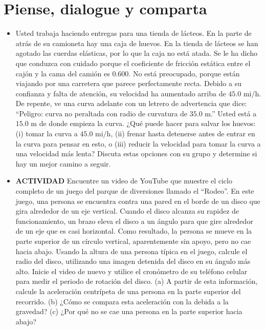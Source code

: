 \documentclass[11pt,a4paper]{article}
\begin{document}
\section*{Piense, dialogue y comparta}

\begin{itemize}
    \item[\textbf{1.}] Usted trabaja haciendo entregas para una tienda de lácteos. En la parte de atrás de su camioneta hay una caja de huevos. En la tienda de lácteos se han agotado las cuerdas elásticas, por lo que la caja no está atada. Se le ha dicho que conduzca con cuidado porque el coeficiente de fricción estática entre el cajón y la cama del camión es $0.600$. No está preocupado, porque están viajando por una carretera que parece perfectamente recta. Debido a su confianza y falta de atención, su velocidad ha aumentado arriba de $45.0 \text{ mi/h}$. De repente, ve una curva adelante con un letrero de advertencia que dice: ``Peligro: curva no peraltada con radio de curvatura de $35.0 \text{ m}$.'' Usted está a $15.0 \text{ m}$ de donde empieza la curva. ¿Qué puede hacer para salvar los huevos: (i) tomar la curva a $45.0 \text{ mi/h}$, (ii) frenar hasta detenerse antes de entrar en la curva para pensar en esto, o (iii) reducir la velocidad para tomar la curva a una velocidad más lenta? Discuta estas opciones con su grupo y determine si hay un mejor camino a seguir.
    \vspace*{9cm}

    \item[\textbf{2.}] \textbf{ACTIVIDAD} Encuentre un video de YouTube que muestre el ciclo completo de un juego del parque de diversiones llamado el ``Rodeo''. En este juego, una persona se encuentra contra una pared en el borde de un disco que gira alrededor de un eje vertical. Cuando el disco alcanza su rapidez de funcionamiento, un brazo eleva el disco a un ángulo para que gire alrededor de un eje que es casi horizontal. Como resultado, la persona se mueve en la parte superior de un círculo vertical, aparentemente sin apoyo, pero no cae hacia abajo. Usando la altura de una persona típica en el juego, calcule el radio del disco, utilizando una imagen detenida del disco en su ángulo más alto. Inicie el video de nuevo y utilice el cronómetro de su teléfono celular para medir el periodo de rotación del disco. (a) A partir de esta información, calcule la aceleración centrípeta de una persona en la parte superior del recorrido. (b) ¿Cómo se compara esta aceleración con la debida a la gravedad? (c) ¿Por qué no se cae una persona en la parte superior hacia abajo?
    \vspace*{8cm}


\end{itemize}
\end{document}
